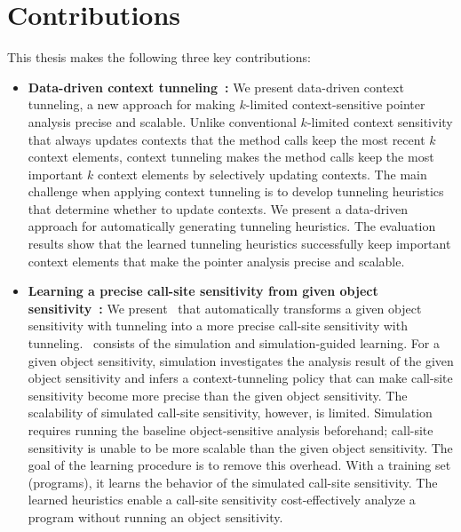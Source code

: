 \section{Contributions}
This thesis makes the following three key contributions:



\begin{itemize}
\item {\bf Data-driven context tunneling~\cite{JeJeOh18}:}
We present data-driven context tunneling, a new approach for making $k$-limited context-sensitive pointer analysis precise and scalable.
Unlike conventional $k$-limited context sensitivity that always updates contexts that the method calls keep the most recent $k$ context elements, context tunneling makes the method calls keep the most important $k$ context elements by selectively updating contexts.
The main challenge when applying context tunneling is to develop tunneling heuristics that determine whether to update contexts. We present a data-driven approach for automatically generating tunneling heuristics. The evaluation results show that the learned tunneling heuristics successfully keep important context elements that make the pointer analysis precise and scalable.


\item {\bf Learning a precise call-site sensitivity from given object sensitivity~\cite{JeOh22}:}
We present \ourtechnique~that automatically transforms a given object sensitivity with tunneling into a more precise call-site sensitivity with tunneling. 
\ourtechnique~consists of the simulation and
simulation-guided learning. For a given object sensitivity, 
simulation investigates the analysis result of the given object sensitivity and infers a context-tunneling policy that can make 
call-site sensitivity become more precise than the given object sensitivity.
The scalability of simulated call-site sensitivity, however, is 
limited. Simulation requires running the baseline object-sensitive
analysis beforehand; call-site sensitivity is unable to be more scalable than the given object sensitivity.
The goal of the learning procedure is to remove this overhead. 
With a training set (programs), it learns the behavior of the simulated call-site sensitivity.
The learned heuristics enable a call-site sensitivity cost-effectively analyze a program without running an object sensitivity.




\end{itemize}
